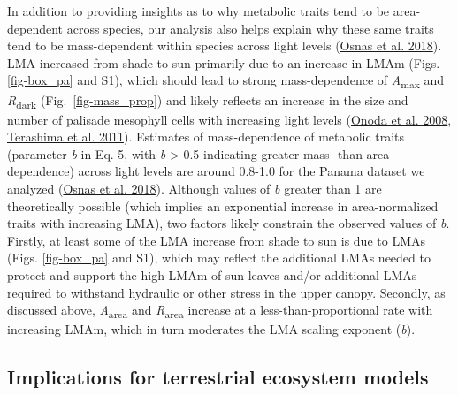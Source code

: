 \documentclass[
  12pt,
  letterpaper,
  DIV=11,
  numbers=noendperiod]{scrartcl}
\begin{document}
In addition to providing insights as to why metabolic traits tend to be
area-dependent across species, our analysis also helps explain why these
same traits tend to be mass-dependent within species across light levels
(\protect\hyperlink{ref-Osnas2018}{Osnas et al. 2018}). LMA increased
from shade to sun primarily due to an increase in LMAm (Figs.
\ref{fig-box_pa} and S1), which should lead to strong mass-dependence of
\emph{A}\textsubscript{max} and \emph{R}\textsubscript{dark}
(Fig.~\ref{fig-mass_prop}) and likely reflects an increase in the size
and number of palisade mesophyll cells with increasing light levels
(\protect\hyperlink{ref-Onoda2008}{Onoda et al. 2008},
\protect\hyperlink{ref-Terashima2011}{Terashima et al. 2011}). Estimates
of mass-dependence of metabolic traits (parameter \emph{b} in Eq. 5,
with \emph{b} \textgreater{} 0.5 indicating greater mass- than
area-dependence) across light levels are around 0.8-1.0 for the Panama
dataset we analyzed (\protect\hyperlink{ref-Osnas2018}{Osnas et al.
2018}). Although values of \emph{b} greater than 1 are theoretically
possible (which implies an exponential increase in area-normalized
traits with increasing LMA), two factors likely constrain the observed
values of \emph{b}. Firstly, at least some of the LMA increase from
shade to sun is due to LMAs (Figs. \ref{fig-box_pa} and S1), which may
reflect the additional LMAs needed to protect and support the high LMAm
of sun leaves and/or additional LMAs required to withstand hydraulic or
other stress in the upper canopy. Secondly, as discussed above,
\emph{A}\textsubscript{area} and \emph{R}\textsubscript{area} increase
at a less-than-proportional rate with increasing LMAm, which in turn
moderates the LMA scaling exponent (\emph{b}).

\hypertarget{implications-for-terrestrial-ecosystem-models}{%
\subsection{Implications for terrestrial ecosystem
models}\label{implications-for-terrestrial-ecosystem-models}}
\end{document}
